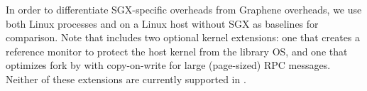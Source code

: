 In order to differentiate SGX-specific overheads 
from Graphene overheads,
we use both
Linux processes and \graphene{} on a Linux host without SGX as baselines
for comparison.
Note that \graphene{} includes two optional kernel extensions:
one that creates a reference monitor to protect the host kernel from 
the library OS, and one that optimizes fork by 
with copy-on-write for large (page-sized) RPC messages.
Neither of these extensions are currently supported in \graphenesgx{}.

